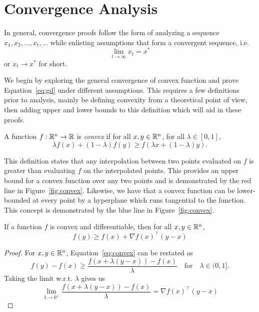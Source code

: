 \section{Convergence Analysis}

In general, convergence proofs follow the form of analyzing a sequence $x_1,
x_2, \dots, x_t, \dots$ while enlisting assumptions that form a convergent
sequence, i.e.
\begin{equation}
    \lim_{t \rightarrow \infty} x_t = x^* 
\end{equation} or $x_t \rightarrow x^*$ for short.

We begin by exploring the general convergence of convex function and prove
Equation~\ref{eq:gd} under different assumptions.  This requires a few
definitions prior to analysis, mainly be defining convexity from a theoretical
point of view, then adding upper and lower bounds to this definition which will
aid in these proofs. 

\begin{definition}
    A function $f: \mathbb R^n \rightarrow \mathbb R$ is \emph{convex} if for all $x, y \in
    \mathbb R^n$, for all $\lambda \in [0, 1]$,
    \begin{equation}
        \label{eq:convex}
        \lambda f(x) + (1 - \lambda)f(y) \geq f(\lambda x + (1 - \lambda)y).
    \end{equation}
\end{definition}

This definition states that any interpolation between two points
evaluated on $f$ is greater than evaluating $f$ on the interpolated points. This
provides an upper bound for a convex function over any two points and is
demonstrated by the red line in Figure~\ref{fig:convex}. Likewise, we
have that a convex function can be lower-bounded at every point by a hyperplane
which runs tangential to the function.
This concept is demonstrated by the blue line in Figure~\ref{fig:convex}. 

\begin{lemma}
    \label{lem:convex_bound}
    If a function $f$ is convex and differentiable, then for all $x, y \in \mathbb R^n$,
    \begin{equation}
        f(y) \geq f(x) + \nabla {f(x)}^\intercal (y - x)
    \end{equation}
\end{lemma}

\begin{proof}
    For $x, y \in \mathbb R^n$, Equation~\ref{eq:convex} can be restated as
    \begin{equation}
        f(y) - f(x) \geq \frac{f(x + \lambda(y - x)) - f(x)}{\lambda} \quad
        \text{for} \quad \lambda \in (0, 1].
    \end{equation}
    Taking the limit w.r.t. $\lambda$ gives us
    \begin{equation}
        \lim_{\lambda \rightarrow 0^+} \frac{f(x + \lambda(y - x)) -
        f(x)}{\lambda} = \nabla {f(x)}^\intercal(y - x)
    \end{equation}
\end{proof}

